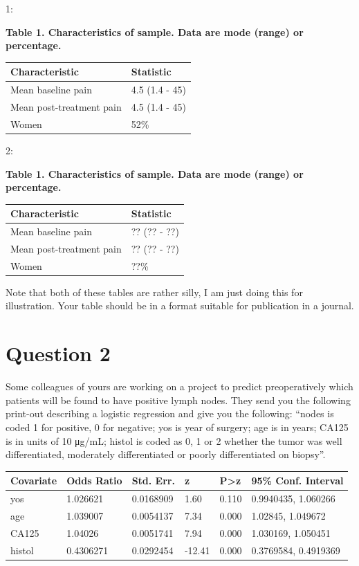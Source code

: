 \documentclass[]{book}
\begin{document}
1:

\textbf{Table 1. Characteristics of sample. Data are mode (range) or
percentage.}

\captionsetup[table]{labelformat=empty,skip=1pt}
\begin{longtable}{ll}
\toprule
Characteristic & Statistic \\ 
\midrule
Mean baseline pain & 4.5 (1.4 - 45) \\ 
Mean post-treatment pain & 4.5 (1.4 - 45) \\ 
Women & 52\% \\ 
\bottomrule
\end{longtable}

2:

\textbf{Table 1. Characteristics of sample. Data are mode (range) or
percentage.}

\captionsetup[table]{labelformat=empty,skip=1pt}
\begin{longtable}{ll}
\toprule
Characteristic & Statistic \\ 
\midrule
Mean baseline pain & ?? (?? - ??) \\ 
Mean post-treatment pain & ?? (?? - ??) \\ 
Women & ??\% \\ 
\bottomrule
\end{longtable}

Note that both of these tables are rather silly, I am just doing this
for illustration. Your table should be in a format suitable for
publication in a journal.

\hypertarget{question-2}{%
\section{Question 2}\label{question-2}}

Some colleagues of yours are working on a project to predict
preoperatively which patients will be found to have positive lymph
nodes. They send you the following print-out describing a logistic
regression and give you the following: ``nodes is coded 1 for positive,
0 for negative; yos is year of surgery; age is in years; CA125 is in
units of 10 μg/mL; histol is coded as 0, 1 or 2 whether the tumor was
well differentiated, moderately differentiated or poorly differentiated
on biopsy''.

\captionsetup[table]{labelformat=empty,skip=1pt}
\begin{longtable}{llllll}
\toprule
Covariate & Odds Ratio & Std. Err. & z & P>z & 95\% Conf. Interval \\ 
\midrule
yos & 1.026621 & 0.0168909 & 1.60 & 0.110 & 0.9940435, 1.060266 \\ 
age & 1.039007 & 0.0054137 & 7.34 & 0.000 & 1.02845, 1.049672 \\ 
CA125 & 1.04026 & 0.0051741 & 7.94 & 0.000 & 1.030169, 1.050451 \\ 
histol & 0.4306271 & 0.0292454 & -12.41 & 0.000 & 0.3769584, 0.4919369 \\ 
\bottomrule
\end{longtable}
\end{document}
